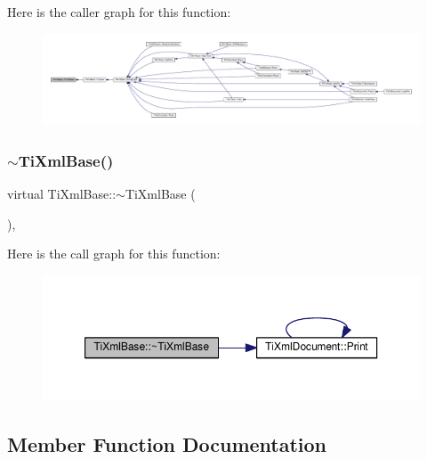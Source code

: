 Here is the caller graph for this function\+:
\nopagebreak
\begin{figure}[H]
\begin{center}
\leavevmode
\includegraphics[width=350pt]{class_ti_xml_base_ac6753fe8a2c89669038fcf281cb301bf_icgraph}
\end{center}
\end{figure}
\mbox{\label{class_ti_xml_base_ad1837ecb25a913612fa1115f090cbb56}} 
\subsubsection{\texorpdfstring{$\sim$\+Ti\+Xml\+Base()}{~TiXmlBase()}}
{\footnotesize\ttfamily virtual Ti\+Xml\+Base\+::$\sim$\+Ti\+Xml\+Base (\begin{DoxyParamCaption}{ }\end{DoxyParamCaption})\hspace{0.3cm}{\ttfamily [inline]}, {\ttfamily [virtual]}}

Here is the call graph for this function\+:
\nopagebreak
\begin{figure}[H]
\begin{center}
\leavevmode
\includegraphics[width=350pt]{class_ti_xml_base_ad1837ecb25a913612fa1115f090cbb56_cgraph}
\end{center}
\end{figure}


\subsection{Member Function Documentation}
\mbox{\label{class_ti_xml_base_ad283b95d9858d5d78c334f4a61b07bb4}} 
